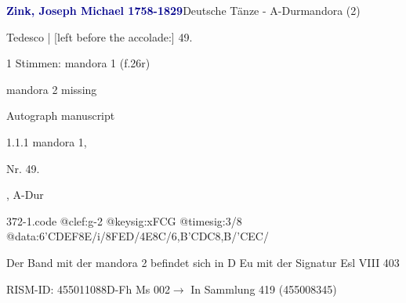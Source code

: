 \documentclass[twocolumn]{book}
\begin{document}
\par \vspace{7pt} \textcolor{darkblue}{\textbf{Zink, Joseph Michael  1758-1829}}\hfillplus{\textbf{[372]}}\newline Deutsche Tänze - A-Dur\newline mandora (2)
\par \begin{itshape}[f.26r, at left:] Tedesco | [left before the accolade:] 49.\end{itshape} 
\par \textcolor{darkblue}{}  1 Stimmen: mandora 1  (f.26r)\newline \begin{small} mandora 2 missing\end{small} \newline Autograph manuscript
\par 1.1.1  mandora 1, \begin{itshape}Nr. 49.\end{itshape}, A-Dur  
\begin{filecontents*}{372-1.code}
@clef:g-2
@keysig:xFCG
@timesig:3/8
@data:{6'CDEF}8E/i/8FED/4E8C/{6,B'CDC}8,B/'CEC/
\end{filecontents*}
\newline
%
\par Der Band mit der mandora 2 befindet sich in D Eu mit der Signatur Esl VIII 403
\par RISM-ID: 455011088\newline D-Fh  Ms 002\newline $\rightarrow$ In Sammlung 419 (455008345)
      
\end{document}
